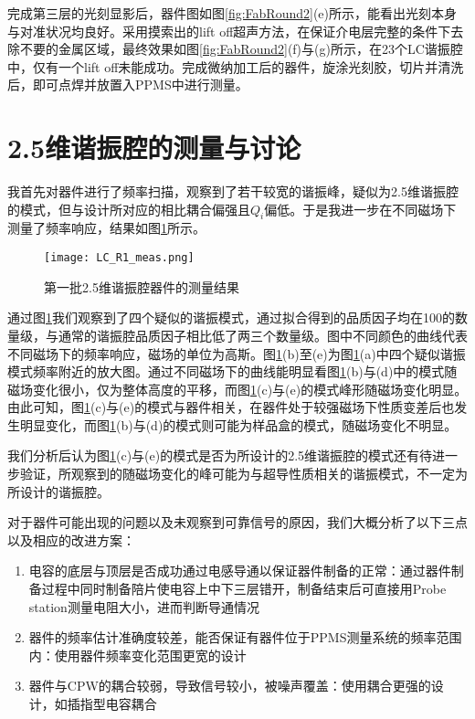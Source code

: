             完成第三层的光刻显影后，器件图如图\ref{fig:FabRound2}(e)所示，能看出光刻本身与对准状况均良好。采用摸索出的lift off超声方法，在保证介电层完整的条件下去除不要的金属区域，最终效果如图\ref{fig:FabRound2}(f)与(g)所示，在23个LC谐振腔中，仅有一个lift off未能成功。完成微纳加工后的器件，旋涂光刻胶，切片并清洗后，即可点焊并放置入PPMS中进行测量。



            



            \section{2.5维谐振腔的测量与讨论} %
            \label{sec:2.5维谐振腔的测量与讨论}
            	

            我首先对器件进行了频率扫描，观察到了若干较宽的谐振峰，疑似为2.5维谐振腔的模式，但与设计所对应的相比耦合偏强且$Q_i$偏低。于是我进一步在不同磁场下测量了频率响应，结果如图\ref{fig:LC_R1_meas}所示。


            \begin{figure}[h]
                \centering
                \texttt{[image: LC\_R1\_meas.png]}
                \caption{第一批2.5维谐振腔器件的测量结果}
                \label{fig:LC_R1_meas}
            \end{figure}


            通过图\ref{fig:LC_R1_meas}我们观察到了四个疑似的谐振模式，通过拟合得到的品质因子均在100的数量级，与通常的谐振腔品质因子相比低了两三个数量级。图中不同颜色的曲线代表不同磁场下的频率响应，磁场的单位为高斯。图\ref{fig:LC_R1_meas}(b)至(e)为图\ref{fig:LC_R1_meas}(a)中四个疑似谐振模式频率附近的放大图。通过不同磁场下的曲线能明显看图\ref{fig:LC_R1_meas}(b)与(d)中的模式随磁场变化很小，仅为整体高度的平移，而图\ref{fig:LC_R1_meas}(c)与(e)的模式峰形随磁场变化明显。由此可知，图\ref{fig:LC_R1_meas}(c)与(e)的模式与器件相关，在器件处于较强磁场下性质变差后也发生明显变化，而图\ref{fig:LC_R1_meas}(b)与(d)的模式则可能为样品盒的模式，随磁场变化不明显。


            我们分析后认为图\ref{fig:LC_R1_meas}(c)与(e)的模式是否为所设计的2.5维谐振腔的模式还有待进一步验证，所观察到的随磁场变化的峰可能为与超导性质相关的谐振模式，不一定为所设计的谐振腔。

            对于器件可能出现的问题以及未观察到可靠信号的原因，我们大概分析了以下三点以及相应的改进方案：
            \begin{enumerate}
                \item 电容的底层与顶层是否成功通过电感导通以保证器件制备的正常：通过器件制备过程中同时制备陪片使电容上中下三层错开，制备结束后可直接用Probe station测量电阻大小，进而判断导通情况
                \item 器件的频率估计准确度较差，能否保证有器件位于PPMS测量系统的频率范围内：使用器件频率变化范围更宽的设计
                \item 器件与CPW的耦合较弱，导致信号较小，被噪声覆盖：使用耦合更强的设计，如插指型电容耦合\cite{goppl2008coplanar}
            \end{enumerate}

